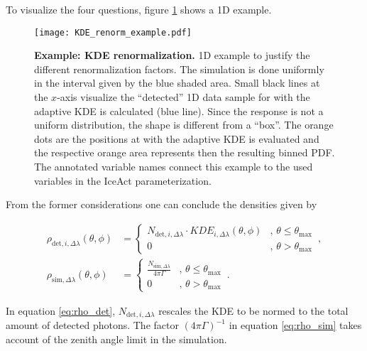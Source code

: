To visualize the four questions, figure \ref{deteff:1d_example} shows a 1D example.

\begin{figure}[h]
	\centering
	\texttt{[image: KDE\_renorm\_example.pdf]}
	\caption[Example: KDE renormalization]{\textbf{Example: KDE renormalization.} 1D example to justify the different renormalization factors. The simulation is done uniformly in the interval given by the blue shaded area. Small black lines at the $x$-axis visualize the \enquote{detected} 1D data sample for with the adaptive KDE is calculated (blue line). Since the response is not a uniform distribution, the shape is different from a \enquote{box}. The orange dots are the positions at with the adaptive KDE is evaluated and the respective orange area represents then the resulting binned PDF. The annotated variable names connect this example to the used variables in the IceAct parameterization.}
	\label{deteff:1d_example}	
\end{figure}

From the former considerations one can conclude the densities given by

\begin{subequations}
	\begin{align}
		\rho_{\text{det},i,\Delta\lambda}(\theta,\phi) &= 
		\begin{cases}
			N_{\text{det},i,\Delta\lambda}\cdot KDE_{i,\Delta\lambda}(\theta,\phi) & ,\,\theta\leq\theta_\text{max}\\
			0 & ,\, \theta > \theta_\text{max}
		\end{cases}\,,
		\label{eq:rho_det}
		\\
		\rho_{\text{sim},\Delta\lambda}(\theta,\phi) &= 
		\begin{cases}
			\frac{N_{\text{sim},\Delta\lambda}}{4\pi\Gamma} & ,\,\theta\leq\theta_\text{max}\\
			0 & ,\, \theta > \theta_\text{max}
		\end{cases}\,.
		\label{eq:rho_sim}
	\end{align}
\end{subequations}

In equation \eqref{eq:rho_det}, $N_{\text{det},i,\Delta\lambda}$ rescales the KDE to be normed to the total amount of detected photons. The factor $(4\pi\Gamma)^{-1}$ in equation \eqref{eq:rho_sim} takes account of the zenith angle limit in the simulation.


